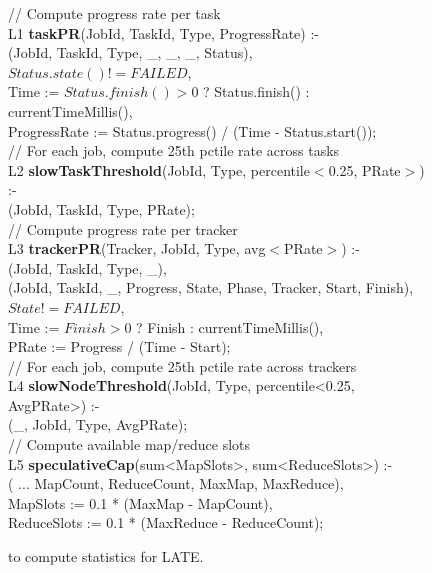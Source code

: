 \begin{figure}[p]
\ssp
\begin{boxedminipage}{\linewidth}

// Compute progress rate per task \\
L1 {\bf taskPR}(JobId, TaskId, Type, ProgressRate) :- \\
(JobId, TaskId, Type, \_, \_, \_, Status), \\
\datalogspace $Status.state() != FAILED$,  \\
\datalogspace Time := $Status.finish() > 0$ ? Status.finish() : currentTimeMillis(), \\
\datalogspace ProgressRate := Status.progress() / (Time - Status.start()); \\

// For each job, compute 25th pctile rate across tasks \\
L2 {\bf slowTaskThreshold}(JobId, Type, percentile$<$0.25, PRate$>$) :- \\
(JobId, TaskId, Type, PRate); \\

// Compute progress rate per tracker \\
L3 {\bf trackerPR}(Tracker, JobId, Type, avg$<$PRate$>$) :- \\ 
(JobId, TaskId, Type, \_), \\
(JobId, TaskId, \_, Progress, State, Phase, Tracker, Start, Finish), \\
\datalogspace $State != FAILED$, \\
\datalogspace Time := $Finish > 0$ ? Finish : currentTimeMillis(), \\ 
\datalogspace PRate := Progress / (Time - Start);  \\

// For each job, compute 25th pctile rate across trackers \\
L4 {\bf slowNodeThreshold}(JobId, Type, percentile<0.25, AvgPRate>) :- \\
(\_, JobId, Type, AvgPRate); \\

// Compute available map/reduce slots \\
L5 {\bf speculativeCap}(sum<MapSlots>, sum<ReduceSlots>) :- \\
( ... MapCount, ReduceCount, MaxMap, MaxReduce), \\
\datalogspace MapSlots := 0.1 * (MaxMap - MapCount), \\
\datalogspace ReduceSlots := 0.1 * (MaxReduce - ReduceCount); \\
\end{boxedminipage}
\caption{\OVERLOG to compute statistics for LATE.}
\label{fig:latePolicy}
\end{figure}

